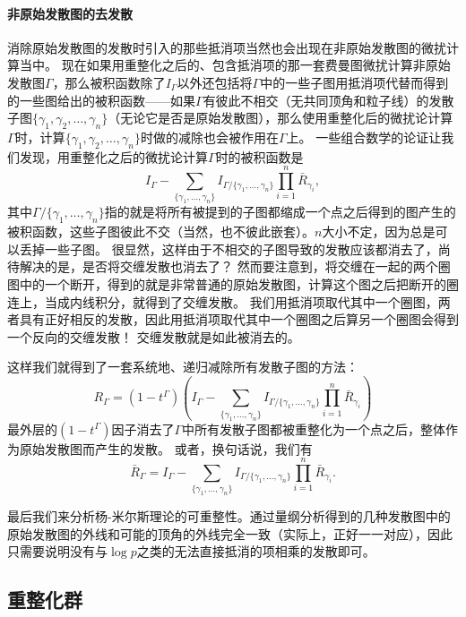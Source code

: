 \documentclass[hyperref, UTF8, a4paper]{ctexart}
\begin{document}
\paragraph{非原始发散图的去发散} 消除原始发散图的发散时引入的那些抵消项当然也会出现在非原始发散图的微扰计算当中。
现在如果用重整化之后的、包含抵消项的那一套费曼图微扰计算非原始发散图$\Gamma$，那么被积函数除了$I_\Gamma$以外还包括将$\Gamma$中的一些子图用抵消项代替而得到的一些图给出的被积函数——如果$\Gamma$有彼此不相交（无共同顶角和粒子线）的发散子图$\{\gamma_1, \gamma_2, \ldots, \gamma_n\}$（无论它是否是原始发散图），那么使用重整化后的微扰论计算$\Gamma$时，计算$\{\gamma_1, \gamma_2, \ldots, \gamma_n\}$时做的减除也会被作用在$\Gamma$上。
一些组合数学的论证让我们发现，用重整化之后的微扰论计算$\Gamma$时的被积函数是
\[
    I_\Gamma - \sum_{\{\gamma_1, \ldots, \gamma_n\}} I_{\Gamma/\{\gamma_1, \ldots, \gamma_n\}} \prod_{i=1}^n \bar{R}_{\gamma_i},
\]
其中$\Gamma/\{\gamma_1, \ldots, \gamma_n\}$指的就是将所有被提到的子图都缩成一个点之后得到的图产生的被积函数，这些子图彼此不交（当然，也不彼此嵌套）。$n$大小不定，因为总是可以丢掉一些子图。
很显然，这样由于不相交的子图导致的发散应该都消去了，尚待解决的是，是否将交缠发散也消去了？
然而要注意到，将交缠在一起的两个圈图中的一个断开，得到的就是非常普通的原始发散图，计算这个图之后把断开的圈连上，当成内线积分，就得到了交缠发散。
我们用抵消项取代其中一个圈图，两者具有正好相反的发散，因此用抵消项取代其中一个圈图之后算另一个圈图会得到一个反向的交缠发散！
交缠发散就是如此被消去的。

这样我们就得到了一套系统地、递归减除所有发散子图的方法：
\begin{equation}
    R_\Gamma = (1 - t^\Gamma)(I_\Gamma - \sum_{\{\gamma_1, \ldots, \gamma_n\}} I_{\Gamma/\{\gamma_1, \ldots, \gamma_n\}} \prod_{i=1}^n \bar{R}_{\gamma_i})
\end{equation}
最外层的$(1-t^\Gamma)$因子消去了$\Gamma$中所有发散子图都被重整化为一个点之后，整体作为原始发散图而产生的发散。
或者，换句话说，我们有
\begin{equation}
    \bar{R}_\Gamma = I_\Gamma - \sum_{\{\gamma_1, \ldots, \gamma_n\}} I_{\Gamma/\{\gamma_1, \ldots, \gamma_n\}} \prod_{i=1}^n \bar{R}_{\gamma_i}.
\end{equation}

最后我们来分析杨-米尔斯理论的可重整性。通过量纲分析得到的几种发散图中的原始发散图的外线和可能的顶角的外线完全一致（实际上，正好一一对应），因此只需要说明没有与$\log p$之类的无法直接抵消的项相乘的发散即可。


\subsection{重整化群}\label{sec:rg}
\end{document}
